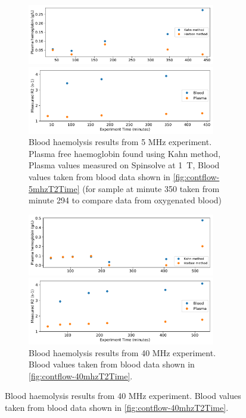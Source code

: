 \begin{figure}[t]
\centering
\begin{subfigure}{\textwidth}
\caption[Blood haemolysis experiment results from 5 MHz experiment]{Blood haemolysis results from 5 MHz experiment. Plasma free haemoglobin found using Kahn method, Plasma \Rtwo values measured on Spinsolve at \SI{1}{T}, Blood \Rtwo values taken from blood data shown in \autoref{fig:contflow-5mhzT2Time} (\Ttwo for sample at minute 350 taken from minute 294 to compare data from oxygenated blood)}
\includegraphics[width=0.9\textwidth]{figures/contflow/haemolyseSpect.pdf}

\includegraphics[width=0.9\textwidth]{figures/contflow/haemolysePlasT2.pdf}
\end{subfigure}

\begin{subfigure}{\textwidth}
\caption[Blood haemolysis experiment results from 40 MHz experiment]{Blood haemolysis results from 40 MHz experiment. Blood \Rtwo values taken from blood data shown in \autoref{fig:contflow-40mhzT2Time}.}
\includegraphics[width=0.9\textwidth]{figures/contflow/40haemolyseSpect.pdf}

\includegraphics[width=0.9\textwidth]{figures/contflow/40haemolysePlasT2.pdf}
\end{subfigure}

\label{fig:contflow-haemolyseResult}
\end{figure}

